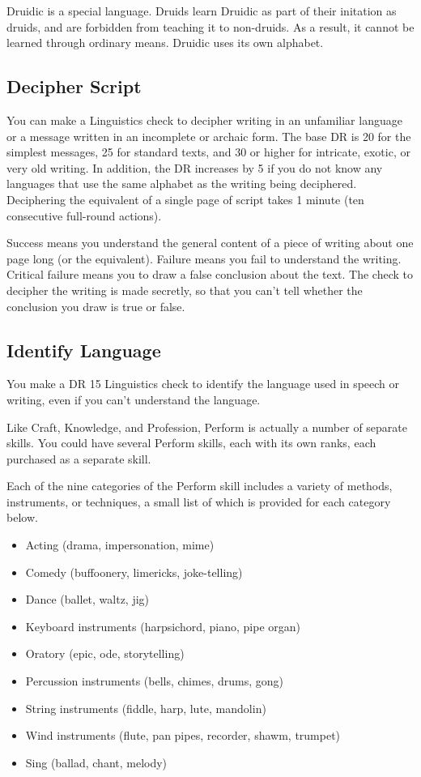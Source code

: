         Druidic is a special language. Druids learn Druidic as part of their initation as druids, and are forbidden from teaching it to non-druids. As a result, it cannot be learned through ordinary means. Druidic uses its own alphabet.

    \subsection{Decipher Script}
        You can make a Linguistics check to decipher writing in an unfamiliar language or a message written in an incomplete or archaic form. The base DR is 20 for the simplest messages, 25 for standard texts, and 30 or higher for intricate, exotic, or very old writing. In addition, the DR increases by 5 if you do not know any languages that use the same alphabet as the writing being deciphered. Deciphering the equivalent of a single page of script takes 1 minute (ten consecutive full-round actions).

        Success means you understand the general content of a piece of writing about one page long (or the equivalent). Failure means you fail to understand the writing. Critical failure means you to draw a false conclusion about the text. The check to decipher the writing is made secretly, so that you can't tell whether the conclusion you draw is true or false.

    \subsection{Identify Language}
        You make a DR 15 Linguistics check to identify the language used in speech or writing, even if you can't understand the language.

        \par Like Craft, Knowledge, and Profession, Perform is actually a number of separate skills. You could have several Perform skills, each with its own ranks, each purchased as a separate skill.

        Each of the nine categories of the Perform skill includes a variety of methods, instruments, or techniques, a small list of which is provided for each category below.
        \begin{itemize}
            \item Acting (drama, impersonation, mime)
            \item Comedy (buffoonery, limericks, joke-telling)
            \item Dance (ballet, waltz, jig)
            \item Keyboard instruments (harpsichord, piano, pipe organ)
            \item Oratory (epic, ode, storytelling)
            \item Percussion instruments (bells, chimes, drums, gong)
            \item String instruments (fiddle, harp, lute, mandolin)
            \item Wind instruments (flute, pan pipes, recorder, shawm, trumpet)
            \item Sing (ballad, chant, melody)
        \end{itemize}

